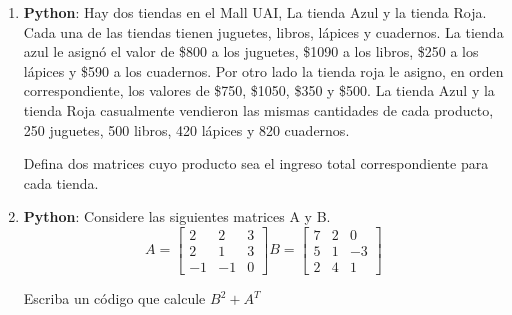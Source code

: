 \documentclass[12pt]{article}
\begin{document}
\begin{enumerate}
    \item \textbf{Python}: Hay dos tiendas en el Mall UAI, La tienda Azul y la tienda
          Roja. Cada una de las tiendas tienen juguetes, libros, l\'apices y cuadernos.
          La tienda azul le asign\'o el valor de \$800 a los juguetes, \$1090 a los libros,
          \$250 a los l\'apices y \$590 a los cuadernos. Por otro lado la tienda roja le asigno,
          en orden correspondiente, los valores de \$750, \$1050, \$350 y \$500.
          La tienda Azul y la tienda Roja casualmente vendieron las mismas cantidades de cada producto,
          250 juguetes, 500 libros, 420 l\'apices y 820 cuadernos.
          
          
          Defina dos matrices cuyo producto sea el ingreso total correspondiente
          para cada tienda.
          
    \item \textbf{Python}:
          Considere las siguientes matrices A y B. 
          $$ A=\begin{bmatrix}
                  2  & 2  & 3            \\
                  2  & 1  & 3            \\
                  -1 & -1 & 0           
              \end{bmatrix}
              B=\begin{bmatrix}
                  7 & 2 & 0              \\
                  5 & 1 & -3             \\
                  2 & 4 & 1             
              \end{bmatrix}  $$
          
          Escriba un código que calcule $B^{2}+A^{T}$
\end{enumerate}
\end{document}
